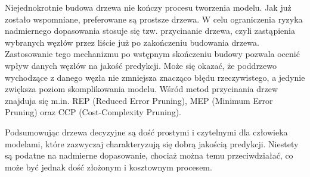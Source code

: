Niejednokrotnie budowa drzewa nie kończy procesu tworzenia modelu. Jak już zostało wspomniane, preferowane są prostsze drzewa. W celu ograniczenia ryzyka nadmiernego dopasowania stosuje się tzw. przycinanie drzewa, czyli zastąpienia wybranych węzłów przez liście już po zakończeniu budowania drzewa. Zastosowanie tego mechanizmu po wstępnym skończeniu budowy pozwala ocenić wpływ danych węzłów na jakość predykcji. Może się okazać, że poddrzewo wychodzące z danego węzła nie zmniejsza znacząco błędu rzeczywistego, a jedynie zwiększa poziom skomplikowania modelu. Wśród metod przycinania drzew znajduja się m.in. REP (Reduced Error Pruning), MEP (Minimum Error Pruning) oraz CCP (Cost-Complexity Pruning).

Podsumowując drzewa decyzyjne są dość prostymi i czytelnymi dla człowieka modelami, które zazwyczaj charakteryzują się dobrą jakością predykcji. Niestety są podatne na nadmierne dopasowanie, chociaż można temu przeciwdziałać, co może być jednak dość złożonym i kosztownym procesem.
